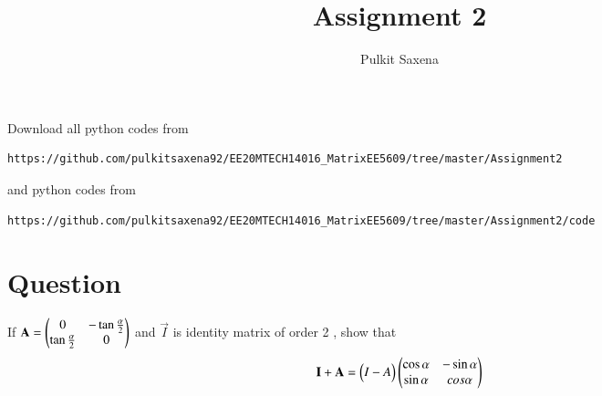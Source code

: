 \documentclass[journal,12pt,onecolumn]{IEEEtran}
\begin{document}
     \def\rightbox#1{\makebox[0in][r]{#1}}
     \def\centbox#1{\makebox[0in]{#1}}
     \def\topbox#1{\raisebox{-\baselineskip}[0in][0in]{#1}}
     \def\midbox#1{\raisebox{-0.5\baselineskip}[0in][0in]{#1}}
\vspace{3cm}
\title{Assignment 2}
\author{Pulkit Saxena}
\maketitle
\bigskip
\renewcommand{\thefigure}{1}
\renewcommand{\thetable}{\theenumi}
Download all python codes from 
\begin{lstlisting}
https://github.com/pulkitsaxena92/EE20MTECH14016_MatrixEE5609/tree/master/Assignment2
\end{lstlisting}
%
and python codes from 
%
\begin{lstlisting}
https://github.com/pulkitsaxena92/EE20MTECH14016_MatrixEE5609/tree/master/Assignment2/code
\end{lstlisting}
\section{\textbf{Question}}
If $\mathbf{A}=\begin{pmatrix}0 & -\tan\frac{\alpha}{2} \\ \tan\frac{\alpha}{2} & 0 \end{pmatrix}$ and $\vec{I}$ is identity matrix of order 2 , show that
\begin{align}
  \mathbf{I}+\mathbf{A}=\begin{pmatrix}I-A\end{pmatrix}\begin{pmatrix}\cos\alpha & -\sin\alpha \\ \sin\alpha & cos\alpha\end{pmatrix}
\end{align}
\end{document}
